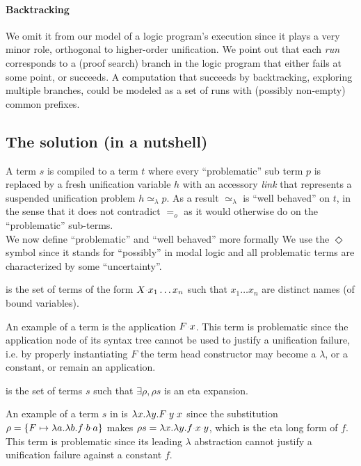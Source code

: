 \documentclass[sigconf,natbib=false,review]{acmart}
\newcommand{\appsep}{\ensuremath{\textcolor{lightgray}{\cdot}}}
\newcommand{\EqualRel}{\ensuremath{=}}
\newcommand{\UnifRel}{\ensuremath{\simeq}}
\newcommand{\Eo}{\ensuremath{\EqualRel_o}\xspace}
\newcommand{\Ue}{\ensuremath{\UnifRel_\lambda}\xspace}
\begin{document}
\paragraph{Backtracking} We omit it from our model of a logic program's execution
since it plays a very minor role, orthogonal to higher-order unification.
We point out that each \emph{run} corresponds to a (proof search) branch in the
logic program that either fails at some point, or succeeds. A computation that
succeeds by backtracking, exploring multiple branches, could be
modeled as a set of runs with (possibly non-empty) common prefixes.

\subsection{The solution (in a nutshell)}
\label{sec:nutshell}
A term $s$ is compiled to a term $t$ where every
``problematic'' sub term $p$ is replaced by a fresh unification variable $h$
with an accessory \emph{link} that represents a suspended unification problem
$h \Ue p$. As a result \Ue is ``well behaved'' on $t$, in the sense that
it does not contradict \Eo as it would otherwise do on the
``problematic'' sub-terms.\\
We now define ``problematic'' and ``well behaved'' more formally
We use the $\Diamond$ symbol since it stands for ``possibly'' in modal logic
and all problematic terms are characterized by some ``uncertainty''.

\begin{definition}[\maybebeta]\label{def:maybebeta}
  \maybebeta is the set of terms of the form $X \appsep x_1 \ldots x_n$
  such that $x_1 \ldots x_n$ are distinct names (of bound variables).
\end{definition}

\noindent
An example of a \maybebeta{} term is the application $F \appsep x$.
This term is problematic since the application node of
its syntax tree cannot be used to justify a
unification failure, i.e. by properly instantiating $F$ the term
head constructor may become a $\lambda$, or a constant, or remain an application.

\begin{definition}[\maybeeta]\label{def:maybeeta}
  \maybeeta is the set of terms $s$ such that $\exists \rho, \rho s$
  is an eta expansion.
\end{definition}

\noindent
An example of a term $s$ in \maybeeta{} is
$\lambda x.\lambda y.F \appsep y \appsep x$
since the substitution
$\rho = \{ F \mapsto \lambda a.\lambda b.f \appsep b \appsep a\}$
makes $\rho s = \lambda x.\lambda y.f \appsep x \appsep y$,
which is the eta long form of $f$. This term is problematic since
its leading $\lambda$ abstraction cannot justify a
unification failure against a constant $f$.
\end{document}
